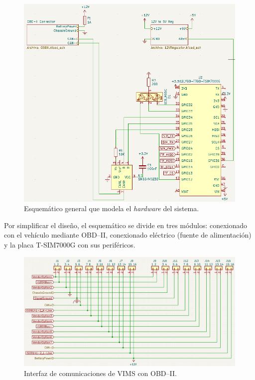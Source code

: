 \begin{figure}[H]
  \centering
  \includegraphics[width=\linewidth]{images/general-schematic.png}
  \caption{Esquemático general que modela el \textit{hardware} del sistema.}
  \label{fig:general-schematic}
\end{figure}

Por simplificar el diseño, el esquemático se divide en tres módulos: conexionado con el
vehículo mediante \ac{OBD}--II, conexionado eléctrico (fuente de alimentación) y la
placa T-SIM7000G con sus periféricos.

\begin{figure}[H]
  \centering
  \includegraphics[width=\linewidth]{images/obd-ii-interface.png}
  \caption{Interfaz de comunicaciones de \ac{VIMS} con \ac{OBD}--II.}
  \label{fig:obd-ii-interface}
\end{figure}


